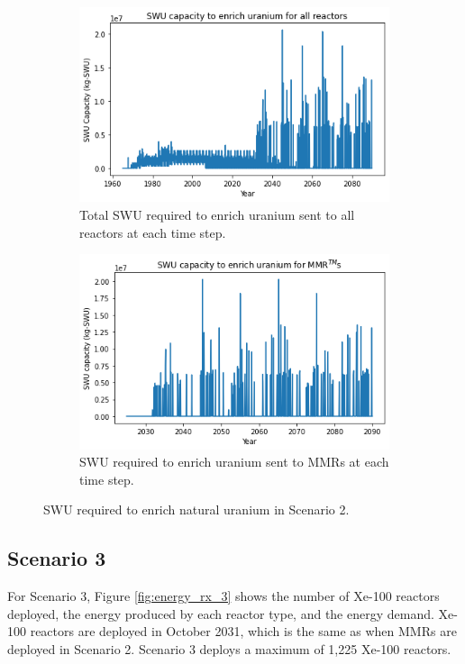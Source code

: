 \begin{figure}
    \centering
    \begin{subfigure}{0.5\textwidth}
        \centering
        \includegraphics[scale=0.5]{../figures/totalswu_scenarios_2.png}
        \caption{Total \gls{SWU} required to enrich uranium sent to all reactors at each time step.}
        \label{fig:totalswu_2}
    \end{subfigure}
    \hspace{0.8cm}
    \begin{subfigure}{0.5\textwidth}
        \centering
        \includegraphics[scale=0.5]{../figures/haleuSWU_scenarios_2.png}
        \caption{\gls{SWU} required to enrich uranium sent to \glspl{MMR} at each time step.}
        \label{fig:haleuswu_2}
    \end{subfigure}
    \caption{\gls{SWU} required to enrich natural uranium in Scenario 2.}
    \label{fig:swu_2}
\end{figure}

\subsection{Scenario 3}
For Scenario 3, Figure \ref{fig:energy_rx_3} shows the number of Xe-100 reactors deployed, 
the energy produced by each reactor type, and the energy demand. 
Xe-100 reactors are deployed in October 2031, which is the same as when 
\glspl{MMR}
are deployed in Scenario 2. Scenario 3 deploys a maximum of 1,225 Xe-100 
reactors.


